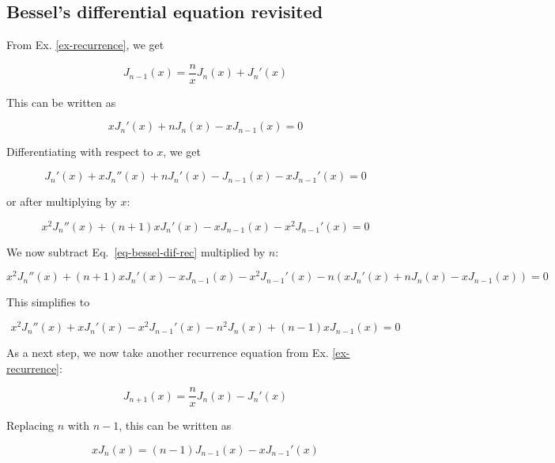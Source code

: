 \subsection{Bessel's differential equation revisited}

From Ex. \ref{ex-recurrence}, we get

\begin{equation}
J_{n-1}(x) = \frac{n}{x}J_n(x) + J_n'(x)
\end{equation}

This can be written as

\begin{equation}
x J_n'(x) + n J_n(x) - x J_{n-1}(x) = 0 \label{eq-bessel-dif-rec}
\end{equation} 

Differentiating with respect to $x$, we get

\begin{equation}
J_n'(x) + x J_n''(x) + n J_n'(x) - J_{n-1}(x) - x J_{n-1}'(x)= 0
\end{equation} 

or after multiplying by $x$:

\begin{equation}
x^2 J_n''(x) + (n + 1) x J_n'(x) - x J_{n-1}(x) - x^2 J_{n-1}'(x)= 0
\end{equation} 

We now subtract Eq.~\ref{eq-bessel-dif-rec} multiplied by $n$:

\begin{equation}
x^2 J_n''(x) + (n + 1) x J_n'(x) - x J_{n-1}(x) - x^2 J_{n-1}'(x) - n\left(x J_n'(x) + n J_n(x) - x J_{n-1}(x)\right)= 0
\end{equation} 

This simplifies to

\begin{equation}
x^2 J_n''(x) +  x J_n'(x) - x^2 J_{n-1}'(x) - n^2 J_n(x) + (n - 1) x J_{n-1}(x)= 0 \label{eq-bessel-dif-rec-2}
\end{equation} 

As a next step, we now take another recurrence equation from Ex. \ref{ex-recurrence}:

\begin{equation}
J_{n+1}(x) = \frac{n}{x}J_n(x) - J_n'(x)
\end{equation} 

Replacing $n$ with $n-1$, this can be written as

\begin{equation}
x J_{n}(x) = (n-1)J_{n-1}(x) - x J_{n-1}'(x)
\end{equation} 

